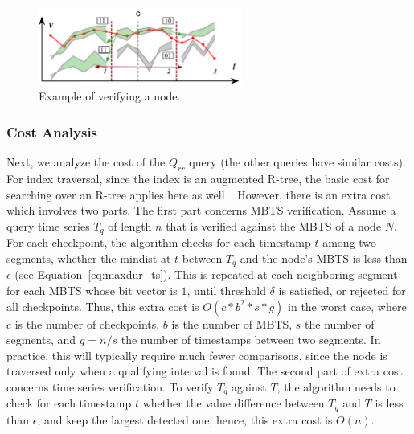 \begin{figure}[!tb]
    \centering
    \includegraphics[width=0.6\textwidth]{Figures/partition_checkpoint_check.png}
    \caption{Example of verifying a \sbtsr node.}
    \label{fig:part_checkpnt}
\end{figure}

\subsubsection{Cost Analysis}
\label{subsubsec:cost}
Next, we analyze the cost of the $Q_{rr}$ query (the other queries have similar costs). For index traversal, since the index is an augmented R-tree, the basic cost for searching over an R-tree applies here as well~\cite{Guttman1984}. However, there is an extra cost which involves two parts. The first part concerns MBTS verification. Assume a query time series $T_q$ of length $n$ that is verified against the MBTS of a node $N$. For each checkpoint, the algorithm checks for each timestamp $t$ among two segments, whether the mindist at $t$ between $T_q$ and the node’s MBTS is less than $\epsilon$ (see Equation~\ref{eq:maxdur_ts}). This is repeated at each neighboring segment for each MBTS whose bit vector is $1$, until threshold $\delta$ is satisfied, or rejected for all checkpoints. Thus, this extra cost is $O(c*b^2*s*g)$ in the worst case, where $c$ is the number of checkpoints, $b$ is the number of MBTS, $s$ the number of segments, and $g=n/s$ the number of timestamps between two segments. In practice, this will typically require much fewer comparisons, since the node is traversed only when a qualifying interval is found. The second part of extra cost concerns time series verification. To verify $T_q$ against $T$, the algorithm needs to check for each timestamp $t$ whether the value difference between $T_q$ and $T$ is less than $\epsilon$, and keep the largest detected one; hence, this extra cost is $O(n)$.